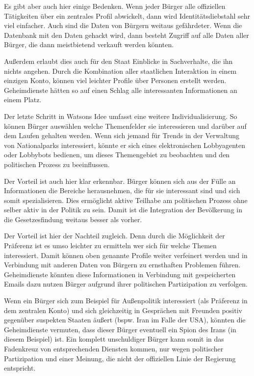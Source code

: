 \documentclass[12pt,twoside,ngerman]{scrartcl}
\theoremstyle{plain}
\theoremstyle{definition}
\theoremstyle{remark}
\begin{document}
	Es gibt aber auch hier einige Bedenken. Wenn jeder Bürger alle offiziellen Tätigkeiten über ein zentrales Profil abwickelt, dann wird Identitätsdiebstahl sehr viel einfacher. Auch sind die Daten von Bürgern weitaus gefährdeter. Wenn die Datenbank mit den Daten gehackt wird, dann besteht Zugriff auf alle Daten aller Bürger, die dann meistbietend verkauft werden könnten. 
	
	Außerdem erlaubt dies auch für den Staat Einblicke in Sachverhalte, die ihn nichts angehen. Durch die Kombination aller staatlichen Interaktion in einem einzigen Konto, können viel leichter Profile über Personen erstellt werden. Geheimdienste hätten so auf einen Schlag alle interessanten Informationen an einem Platz.
	
	Der letzte Schritt in Watsons Idee umfasst eine weitere Individualisierung. So können Bürger auswählen welche Themenfelder sie interessieren und darüber auf dem Laufen gehalten werden. Wenn sich jemand für Trends in der Verwaltung von Nationalparks interessiert, könnte er sich eines elektronischen Lobbyagenten oder Lobbybots bedienen, um dieses Themengebiet zu beobachten und den politischen Prozess zu beeinflussen.
	
	Der Vorteil ist auch hier klar erkennbar. Bürger können sich aus der Fülle an Informationen die Bereiche herausnehmen, die für sie interessant sind und sich somit spezialisieren. Dies ermöglicht aktive Teilhabe am politischen Prozess ohne selber aktiv in der Politik zu sein. Damit ist die Integration der Bevölkerung in die Gesetzesfindung weitaus besser als vorher.
	
	Der Vorteil ist hier der Nachteil zugleich. Denn durch die Möglichkeit der Präferenz ist es umso leichter zu ermitteln wer sich für welche Themen interessiert. Damit können oben genannte Profile weiter verfeinert werden und in Verbindung mit anderen Daten von Bürgern zu ernsthaften Problemen führen. Geheimdienste könnten diese Informationen in Verbindung mit gespeicherten Emails dazu nutzen Bürger aufgrund ihrer politischen Partizipation zu verfolgen. 
	
	Wenn ein Bürger sich zum Beispiel für Außenpolitik interessiert (als Präferenz in dem zentralen Konto) und sich gleichzeitig in Gesprächen mit Freunden positiv gegenüber suspekten Staaten äußert (bspw. Iran im Falle der USA), könnten die Geheimdienste vermuten, dass dieser Bürger eventuell ein Spion des Irans (in diesem Beispiel) ist. Ein komplett unschuldiger Bürger kann somit in das Fadenkreuz von entsprechenden Diensten kommen, nur wegen politischer Partizipation und einer Meinung, die nicht der offiziellen Linie der Regierung entspricht.
	
\end{document}
